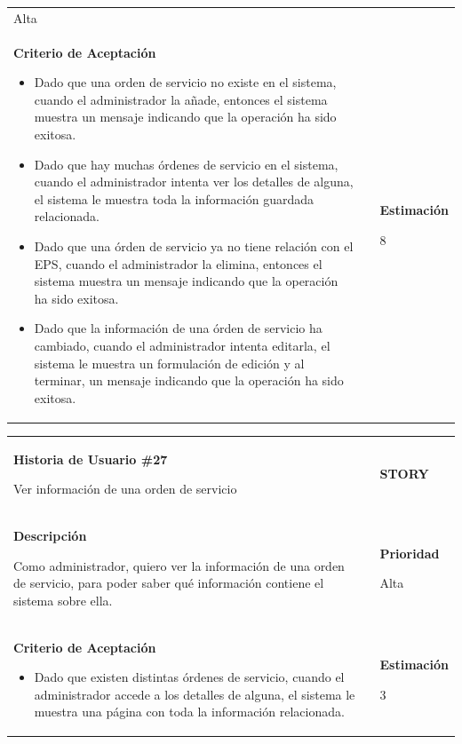 \documentclass[12pt,a4paper]{article}
\begin{document}
\begin{center}
\begin{tabular}{|>{\columncolor[RGB]{215, 215, 215}} p{10cm} >{\columncolor[RGB]{215, 215, 215}} c >{\columncolor[RGB]{215, 215, 215}} p{2.5cm}|}
Alta\\

\textbf{Criterio de Aceptación}

\begin{itemize}
\item Dado que una orden de servicio no existe en el sistema, cuando el
administrador la añade, entonces el sistema muestra un mensaje
indicando que la operación ha sido exitosa.
\item Dado que hay muchas órdenes de servicio en el sistema, cuando el
administrador intenta ver los detalles de alguna, el sistema le
muestra toda la información guardada relacionada.
\item Dado que una órden de servicio ya no tiene relación con el EPS, cuando el
administrador la elimina, entonces el sistema muestra un
mensaje indicando que la operación ha sido exitosa.
\item Dado que la información de una órden de servicio ha cambiado, cuando
el administrador intenta editarla, el sistema le muestra un
formulación de edición y al terminar, un mensaje indicando que
la operación ha sido exitosa.
\end{itemize} & & \textbf{Estimación}

8 \\ 
\hline 
\end{tabular}
\vspace{5mm}

\begin{tabular}{| p{10cm} c p{2.5cm}|}
\hline 
\textbf{Historia de Usuario \#27}

Ver información de una orden de servicio & & \textbf{{\Large STORY}} \\ 
\textbf{Descripción}

Como administrador, quiero ver la información de una orden de servicio, para
poder saber qué información contiene el sistema sobre ella. &  & \textbf{Prioridad}

Alta\\

\textbf{Criterio de Aceptación}

\begin{itemize}
\item Dado que existen distintas órdenes de servicio, cuando el administrador
accede a los detalles de alguna, el sistema le muestra una página
con toda la información relacionada.
\end{itemize} & & \textbf{Estimación}

3 \\ 
\hline 
\end{tabular}
\vspace{5mm}


\end{center}
\end{document}
